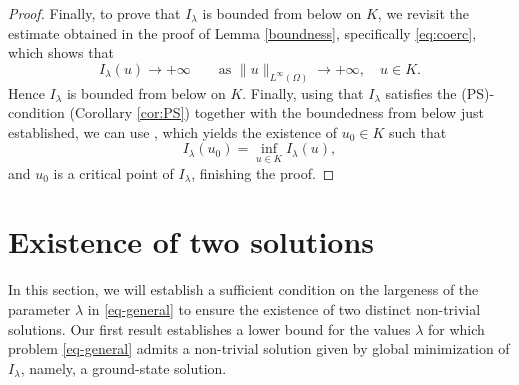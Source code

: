 \documentclass[11pt,reqno]{amsart}
\theoremstyle{plain}
\theoremstyle{definition}
\numberwithin{equation}{section}
\begin{document}
\begin{proof}
    \medskip
    Finally, to prove that $I_\lambda$ is bounded from below on $K$,  
    we revisit the estimate obtained in the proof of Lemma \ref{boundness}, specifically \eqref{eq:coerc}, which shows that
$$
I_\lambda(u)\to+\infty
\qquad\text{as }\|u\|_{L^\infty(\Omega)}\to+\infty,
\quad u\in K.
$$
Hence $I_\lambda$ is bounded from below on $K$. Finally, using that $I_\lambda$ satisfies the (PS)-condition (Corollary \ref{cor:PS}) together with the boundedness from below just established, we can use {\cite[Theorem 1.7]{Sz86}}, which yields the existence of $u_0\in K$ such that
$$
I_\lambda(u_0)=\inf_{u\in K} I_\lambda(u),
$$
and $u_0$ is a critical point of $I_\lambda$, finishing the proof.
\end{proof}

\section{Existence of two solutions}\label{sec3}
In this section, we will establish a sufficient condition on the largeness of the parameter $\lambda$ in \eqref{eq-general} to ensure the existence of two distinct non-trivial solutions. Our first result establishes a lower bound for the values $\lambda$ for which problem \eqref{eq-general} admits a non-trivial solution given by global minimization of $I_\lambda$, namely, a ground-state solution. 
 
\end{document}
